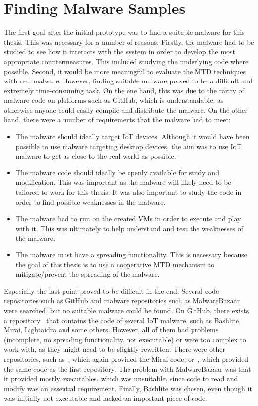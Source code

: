 \section{Finding Malware Samples} \label{main:bashlite}
The first goal after the initial prototype was to find a suitable malware for this thesis. This was necessary for a number of reasons: Firstly, the malware had to be studied to see how it interacts with the system in order to develop the most appropriate countermeasures. This included studying the underlying code where possible. Second, it would be more meaningful to evaluate the MTD techniques with real malware. However, finding suitable malware proved to be a difficult and extremely time-consuming task. On the one hand, this was due to the rarity of malware code on platforms such as GitHub, which is understandable, as otherwise anyone could easily compile and distribute the malware. On the other hand, there were a number of requirements that the malware had to meet:
\begin{itemize}
    \item The malware should ideally target IoT devices. Although it would have been possible to use malware targeting desktop devices, the aim was to use IoT malware to get as close to the real world as possible.
    \item The malware code should ideally be openly available for study and modification. This was important as the malware will likely need to be tailored to work for this thesis. It was also important to study the code in order to find possible weaknesses in the malware.
    \item The malware had to run on the created VMs in order to execute and play with it. This was ultimately to help understand and test the weaknesses of the malware. 
    \item The malware must have a spreading functionality. This is necessary because the goal of this thesis is to use a cooperative MTD mechanism to mitigate/prevent the spreading of the malware.  
\end{itemize}

Especially the last point proved to be difficult in the end. Several code repositories such as GitHub and malware repositories such as MalwareBazaar were searched, but no suitable malware could be found. On GitHub, there exists a repository~\cite{website:iot-malware-2017} that contains the code of several IoT malware, such as Bashlite, Mirai, Lightaidra and some others. However, all of them had problems (incomplete, no spreading functionality, not executable) or were too complex to work with, as they might need to be slightly rewritten. There were other repositories, such as~\cite{website:githubMirai}, which again provided the Mirai code, or~\cite{website:githubBashlite}, which provided the same code as the first repository. The problem with MalwareBazaar was that it provided mostly executables, which was unsuitable, since code to read and modify was an essential requirement. Finally, Bashlite was chosen, even though it was initially not executable and lacked an important piece of code.

